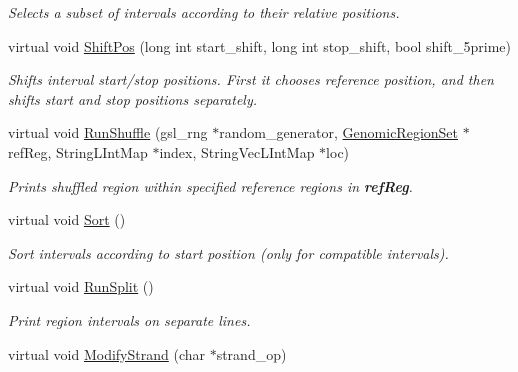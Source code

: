 \begin{CompactItemize}
\begin{CompactList}\small\item\em Selects a subset of intervals according to their relative positions. \item\end{CompactList}\item 
virtual void \hyperlink{classGenomicRegion_dc42fea61283fa8134d65467b2292405}{ShiftPos} (long int start\_\-shift, long int stop\_\-shift, bool shift\_\-5prime)
\begin{CompactList}\small\item\em Shifts interval start/stop positions. First it chooses reference position, and then shifts start and stop positions separately. \item\end{CompactList}\item 
\hypertarget{classGenomicRegion_b2c52ae40b34f3607f4558add94c25fd}{
virtual void \hyperlink{classGenomicRegion_b2c52ae40b34f3607f4558add94c25fd}{RunShuffle} (gsl\_\-rng $\ast$random\_\-generator, \hyperlink{classGenomicRegionSet}{GenomicRegionSet} $\ast$refReg, StringLIntMap $\ast$index, StringVecLIntMap $\ast$loc)}
\label{classGenomicRegion_b2c52ae40b34f3607f4558add94c25fd}

\begin{CompactList}\small\item\em Prints shuffled region within specified reference regions in {\bf refReg}. \item\end{CompactList}\item 
\hypertarget{classGenomicRegion_03959dc5b5695d817b5a40b47f30a4aa}{
virtual void \hyperlink{classGenomicRegion_03959dc5b5695d817b5a40b47f30a4aa}{Sort} ()}
\label{classGenomicRegion_03959dc5b5695d817b5a40b47f30a4aa}

\begin{CompactList}\small\item\em Sort intervals according to start position (only for compatible intervals). \item\end{CompactList}\item 
\hypertarget{classGenomicRegion_1686d4f4d2962b22d506a25a5887c31c}{
virtual void \hyperlink{classGenomicRegion_1686d4f4d2962b22d506a25a5887c31c}{RunSplit} ()}
\label{classGenomicRegion_1686d4f4d2962b22d506a25a5887c31c}

\begin{CompactList}\small\item\em Print region intervals on separate lines. \item\end{CompactList}\item 
\hypertarget{classGenomicRegion_e19cd6eaa883e6517ba12567cd756320}{
virtual void \hyperlink{classGenomicRegion_e19cd6eaa883e6517ba12567cd756320}{ModifyStrand} (char $\ast$strand\_\-op)}
\label{classGenomicRegion_e19cd6eaa883e6517ba12567cd756320}


\end{CompactItemize}
